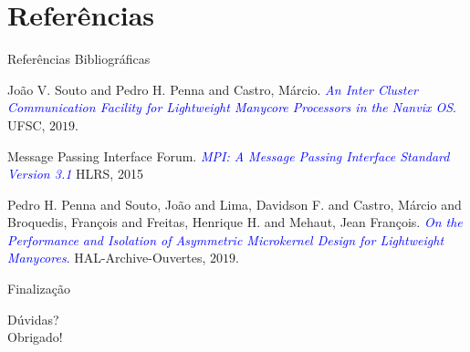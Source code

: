 \documentclass{beamer}
\begin{document}
\section{Referências}
  \begin{frame}{Referências Bibliográficas}
    \begin{thebibliography}{10}
       João V. Souto and Pedro H. Penna and Castro, Márcio.
      \textcolor{blue}{\em An Inter Cluster Communication Facility for Lightweight Manycore
        Processors in the Nanvix OS}.
      {UFSC, $2019$}.

      \medskip

       Message Passing Interface Forum. \textcolor{blue}{\em MPI: A Message
        Passing Interface Standard Version 3.1} {HLRS, 2015}

      \medskip

       Pedro H. Penna and Souto, João and Lima, Davidson F. and
        Castro, Márcio and Broquedis, François and Freitas, Henrique H. and Mehaut, Jean François.
        \textcolor{blue}{\em On the Performance and Isolation of Asymmetric Microkernel Design for
        Lightweight Manycores}. {HAL-Archive-Ouvertes, $2019$}.
    \end{thebibliography}
  \end{frame}


\begin{frame}{Finalização}
  \begin{center}
    \Huge{Dúvidas?} \\
    \Huge{Obrigado!}
  \end{center}
\end{frame}
\end{document}
